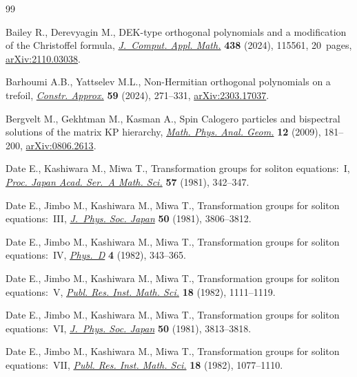 \documentclass[pdftex]{sigma}
\numberwithin{equation}{section}
\theoremstyle{definition}
\begin{document}
\begin{thebibliography}{99}
\footnotesize\itemsep=0pt

Bailey R., Derevyagin M., D{EK}-type orthogonal polynomials and a modification
 of the {C}hristoffel formula,
 \href{https://doi.org/10.1016/j.cam.2023.115561}{\textit{J.~Comput. Appl.
 Math.}} \textbf{438} (2024), 115561, 20~pages,
 \href{http://arxiv.org/abs/2110.03038}{arXiv:2110.03038}.

Barhoumi A.B., Yattselev M.L., Non-{H}ermitian orthogonal polynomials on a
 trefoil, \href{https://doi.org/10.1007/s00365-023-09640-6}{\textit{Constr.
 Approx.}} \textbf{59} (2024), 271--331,
 \href{http://arxiv.org/abs/2303.17037}{arXiv:2303.17037}.

Bergvelt M., Gekhtman M., Kasman A., Spin {C}alogero particles and bispectral
 solutions of the matrix {KP} hierarchy,
 \href{https://doi.org/10.1007/s11040-009-9058-y}{\textit{Math. Phys. Anal.
 Geom.}} \textbf{12} (2009), 181--200,
 \href{http://arxiv.org/abs/0806.2613}{arXiv:0806.2613}.

Date E., Kashiwara M., Miwa T., Transformation groups for soliton
 equations:~{I}, \href{https://doi.org/10.3792/pjaa.57.342}{\textit{Proc.
 Japan Acad. Ser.~A Math. Sci.}} \textbf{57} (1981), 342--347.

Date E., Jimbo M., Kashiwara M., Miwa T., Transformation groups for soliton
 equations:~{III},
 \href{https://doi.org/10.1143/JPSJ.50.3806}{\textit{J.~Phys. Soc. Japan}}
 \textbf{50} (1981), 3806--3812.

Date E., Jimbo M., Kashiwara M., Miwa T., Transformation groups for soliton
 equations:~{IV},
 \href{https://doi.org/10.1016/0167-2789(82)90041-0}{\textit{Phys.~D}}
 \textbf{4} (1982), 343--365.

Date E., Jimbo M., Kashiwara M., Miwa T., Transformation groups for soliton
 equations:~{V}, \href{https://doi.org/10.2977/prims/1195183298}{\textit{Publ.
 Res. Inst. Math. Sci.}} \textbf{18} (1982), 1111--1119.

Date E., Jimbo M., Kashiwara M., Miwa T., Transformation groups for soliton
 equations:~{VI}, \href{https://doi.org/10.1143/JPSJ.50.3813}{\textit{J.~Phys.
 Soc. Japan}} \textbf{50} (1981), 3813--3818.

Date E., Jimbo M., Kashiwara M., Miwa T., Transformation groups for soliton
 equations:~{VII},
 \href{https://doi.org/10.2977/PRIMS/1195183297}{\textit{Publ. Res. Inst.
 Math. Sci.}} \textbf{18} (1982), 1077--1110.


\end{thebibliography}
\end{document}
